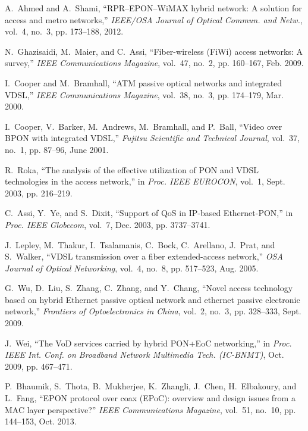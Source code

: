 \documentclass[pdftex,journal]{IEEEtran}
\begin{document}
\begin{thebibliography}{10}
A.~Ahmed and A.~Shami, ``{RPR--EPON--WiMAX} hybrid network: A solution for
  access and metro networks,'' \emph{IEEE/OSA Journal of Optical Commun. and
  Netw.}, vol.~4, no.~3, pp. 173--188, 2012.

N.~Ghazisaidi, M.~Maier, and C.~Assi, ``Fiber-wireless ({FiWi}) access
  networks: A survey,'' \emph{IEEE Communications Magazine}, vol.~47, no.~2,
  pp. 160--167, Feb. 2009.

I.~Cooper and M.~Bramhall, ``{ATM} passive optical networks and integrated
  {VDSL},'' \emph{IEEE Communications Magazine}, vol.~38, no.~3, pp. 174--179,
  Mar. 2000.

I.~Cooper, V.~Barker, M.~Andrews, M.~Bramhall, and P.~Ball, ``Video over {BPON}
  with integrated {VDSL},'' \emph{Fujitsu Scientific and Technical Journal},
  vol.~37, no.~1, pp. 87--96, June 2001.

R.~Roka, ``The analysis of the effective utilization of {PON} and {VDSL}
  technologies in the access network,'' in \emph{Proc. IEEE EUROCON}, vol.~1,
  Sept. 2003, pp. 216--219.

C.~Assi, Y.~Ye, and S.~Dixit, ``Support of {QoS} in {IP}-based
  {Ethernet-PON},'' in \emph{Proc. IEEE Globecom}, vol.~7, Dec. 2003, pp.
  3737--3741.

J.~Lepley, M.~Thakur, I.~Tsalamanis, C.~Bock, C.~Arellano, J.~Prat, and
  S.~Walker, ``{VDSL} transmission over a fiber extended-access network,''
  \emph{OSA Journal of Optical Networking}, vol.~4, no.~8, pp. 517--523, Aug.
  2005.

G.~Wu, D.~Liu, S.~Zhang, C.~Zhang, and Y.~Chang, ``Novel access technology
  based on hybrid {Ethernet} passive optical network and ethernet passive
  electronic network,'' \emph{Frontiers of Optoelectronics in China}, vol.~2,
  no.~3, pp. 328--333, Sept. 2009.

J.~Wei, ``The {VoD} services carried by hybrid {PON+EoC} networking,'' in
  \emph{Proc. IEEE Int. Conf. on Broadband Network Multimedia Tech. (IC-BNMT)},
  Oct. 2009, pp. 467--471.

P.~Bhaumik, S.~Thota, B.~Mukherjee, K.~Zhangli, J.~Chen, H.~Elbakoury, and
  L.~Fang, ``{EPON protocol over coax (EPoC)}: overview and design issues from
  a {MAC} layer perspective?'' \emph{IEEE Communications Magazine}, vol.~51,
  no.~10, pp. 144--153, Oct. 2013.


\end{thebibliography}
\end{document}
